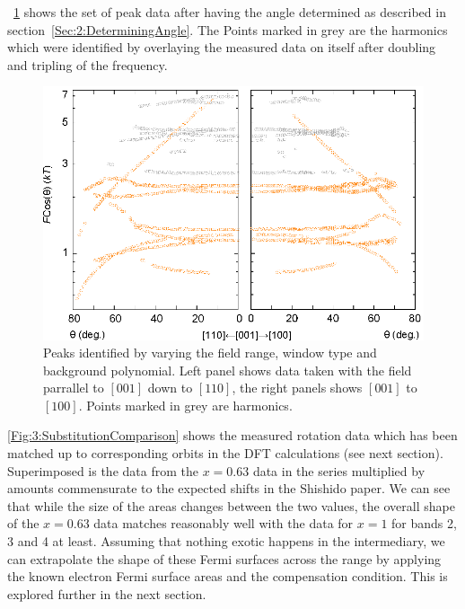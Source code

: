 \Fig~\ref{Fig:3:AngleSweepMeasured} shows the set of peak data after having the angle determined as described in section~\ref{Sec:2:DeterminingAngle}. The Points marked in grey are the harmonics which were identified by overlaying the measured data on itself after doubling and tripling of the frequency.
\begin{figure}[h!]
    \begin{center}
        \includegraphics[scale=0.7]{Chapter3-dHvABaFe2P2/Figures/AngleDepMeasurements/AngleSweepMeasured/AngleSweepMeasured}
        \caption{Peaks identified by varying the field range, window type and background polynomial. Left panel shows data taken with the field parrallel to $[001]$ down to $[110]$, the right panels shows $[001]$ to $[100]$. Points marked in grey are harmonics.}
        \label{Fig:3:AngleSweepMeasured}
    \end{center}
\end{figure}
\Fig\ref{Fig:3:SubstitutionComparison} shows the measured rotation data which has been matched up to corresponding orbits in the DFT calculations (see next section). Superimposed is the data from the $x=0.63$ data in the \BaFeAsP series multiplied by amounts commensurate to the expected shifts in the Shishido paper\cite{Shishido2010}. We can see that while the size of the areas changes between the two values, the overall shape of the $x=0.63$ data matches reasonably well with the data for $x=1$ for bands 2, 3 and 4 at least. Assuming that nothing exotic happens in the intermediary, we can extrapolate the shape of these Fermi surfaces across the range by applying the known electron Fermi surface areas and the compensation condition. This is explored further in the next section.
